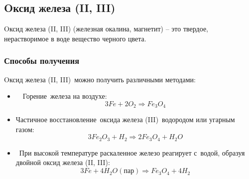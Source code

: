 \documentclass[11pt]{article}
\begin{document}
\subsection{Oксид железа (II, III)}
Oксид железа (II, III) (железная окалина, магнетит) – это твердое,
нерастворимое в воде вещество черного цвета.
\subsubsection{Способы получения}
Oксид железа (II, III) можно получить различными методами:
\begin{itemize}
\item  Горение железа на воздухе:
$$3Fe  +  2O _2   \Rightarrow  Fe _3 O _4$$
\item Частичное восстановление оксида железа (III) водородом или угарным
газом:
$$3Fe _2 O _3   +  H _2   \Rightarrow  2Fe _3 O _4   +  H _2 O$$
\item При высокой температуре раскаленное железо реагирует с водой, образуя
двойной оксид железа (II, III):
$$3Fe  +  4H _2 O (пар)   \Rightarrow Fe _3 O _4   +  4H _2$$
\end{itemize}
\end{document}
